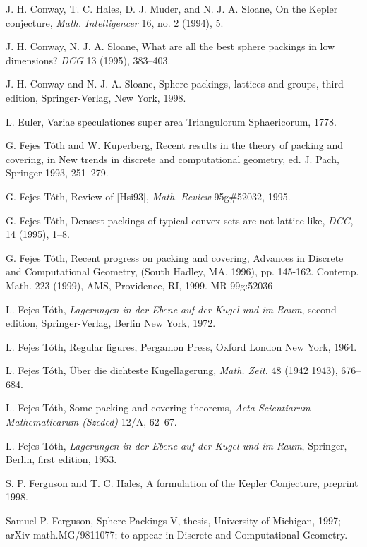 \begin{thebibliography}{CHMS94}
 J. H. Conway, T. C. Hales, D. J. Muder, and N. J. A. Sloane,
    On the Kepler conjecture, {\it Math. Intelligencer} 16,
    no. 2 (1994), 5.

  J. H. Conway,  N. J. A. Sloane, What are all the
best sphere packings in low dimensions? {\it DCG} 13 (1995),
383--403.

 J. H. Conway and N. J. A. Sloane, Sphere packings, lattices
    and groups,  third edition, Springer-Verlag, New York, 1998.

 L. Euler, Variae speculationes super area
Triangulorum Sphaericorum, 1778.

 G. Fejes T\'oth and W. Kuperberg, Recent results in the
    theory of packing and covering, in New trends in
    discrete and computational geometry, ed. J. Pach, Springer
    1993, 251--279.

 G. Fejes T\'oth, Review of [Hsi93], {\it Math. Review} 95g\#52032, 1995.

 G. Fejes T\'oth, Densest packings of typical convex sets
    are not lattice-like, {\it DCG}, 14 (1995), 1--8.

 G. Fejes T\'oth, Recent progress on packing and covering,
     Advances
in Discrete and Computational Geometry, (South Hadley, MA, 1996),
pp. 145-162. Contemp. Math. 223 (1999), AMS, Providence, RI, 1999.
MR 99g:52036

 L. Fejes T\'oth, {\it Lagerungen in der Ebene auf der
    Kugel und im Raum}, second edition,
    Springer-Verlag, Berlin New York, 1972.

 L. Fejes T\'oth, Regular figures, Pergamon Press,
    Oxford London New York, 1964.

 L. Fejes T\'oth,  \"Uber die dichteste Kugellagerung,
{\it Math. Zeit.} 48 (1942 1943), 676--684.

 L. Fejes T\'oth, Some packing and covering theorems,
    {\it Acta Scientiarum Mathematicarum (Szeded)} 12/A, 62--67.

 L. Fejes T\'oth, {\it Lagerungen in der Ebene auf
der Kugel und im Raum}, Springer, Berlin, first edition, 1953.

 S. P. Ferguson and T. C. Hales, A formulation of
the Kepler Conjecture, preprint 1998.

 Samuel P. Ferguson, Sphere
Packings V, thesis, University of Michigan,
    1997;  arXiv math.MG/9811077; to appear in Discrete and Computational
    Geometry.


\end{thebibliography}

